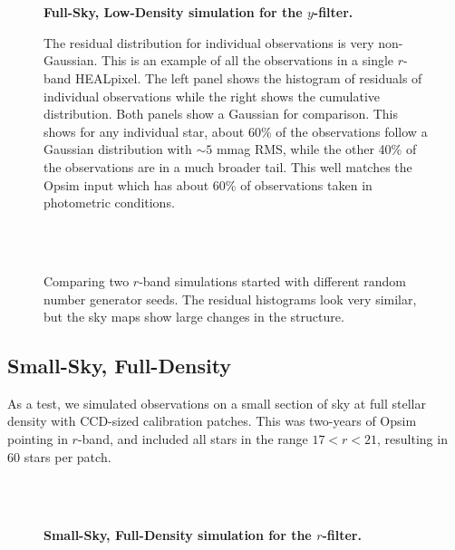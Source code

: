 \documentclass[12pt,preprint]{aastex}
\begin{document}
\begin{figure}
 \\
 \\
\caption{ {\bf Full-Sky, Low-Density simulation for the $y$-filter.}  \label{fig:y1e6}}
\end{figure}


\begin{figure}
\caption{The residual distribution for individual observations is very non-Gaussian.  This is an example of all the observations in a single $r$-band HEALpixel.  The left panel shows the histogram of residuals of individual observations while the right shows the cumulative distribution.  Both panels show a Gaussian for comparison.  This shows for any individual star, about 60\% of the observations follow a Gaussian distribution with $\sim5$ mmag RMS, while the other 40\% of the observations are in a much broader tail.  This well matches the Opsim input which has about 60\% of observations taken in photometric conditions. \label{fig:resid_dist}}
\end{figure}


\begin{figure}
 \\
 \\
\caption{Comparing two $r$-band simulations started with different random number generator seeds.  The residual histograms look very similar, but the sky maps show large changes in the structure. \label{fig:diffseed} }
\end{figure}


\subsection{Small-Sky, Full-Density}
As a test, we simulated observations on a small section of sky at full stellar density with CCD-sized calibration patches.  This was two-years of Opsim pointing in $r$-band, and included all stars in the range $17 < r < 21 $, resulting in 60 stars per patch.  

\begin{figure}
 \\
 \\
\caption{ {\bf Small-Sky, Full-Density simulation for the $r$-filter.}  \label{fig:r1e6hd}}
\end{figure}
\end{document}
